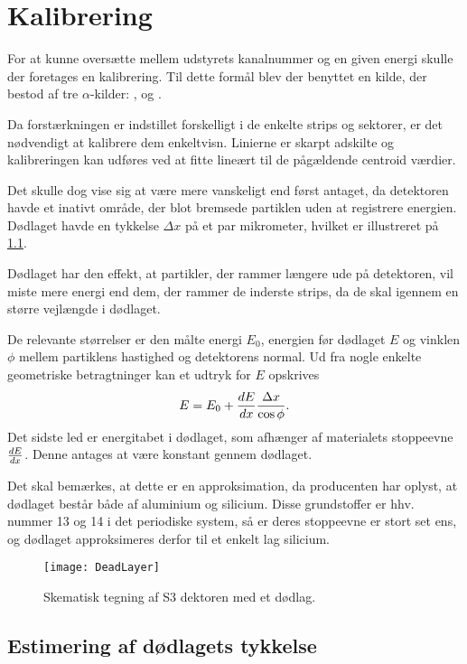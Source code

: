 \chapter{Kalibrering}
\label{cha:kalibrering}

For at kunne oversætte mellem udstyrets kanalnummer og en given energi skulle der foretages en
kalibrering. Til dette formål blev der benyttet en kilde, der bestod af tre $\alpha$-kilder:
,  og .

Da forstærkningen er indstillet forskelligt i de enkelte strips og sektorer, er det nødvendigt at
kalibrere dem enkeltvisn. Linierne er skarpt adskilte og kalibreringen kan udføres ved at fitte
lineært til de pågældende centroid værdier.

Det skulle dog vise sig at være mere vanskeligt end først antaget, da detektoren havde et inativt
område, der blot bremsede partiklen uden at registrere energien. Dødlaget havde en tykkelse
$\Delta x$ på et par mikrometer, hvilket er illustreret på \cref{fig:deadLayer}.

Dødlaget har den effekt, at partikler, der rammer længere ude på detektoren, vil miste mere energi
end dem, der rammer de inderste strips, da de skal igennem en større vejlængde i dødlaget.

De relevante størrelser er den målte energi $E_{0}$, energien før dødlaget $E$ og vinklen $\phi$ mellem
partiklens hastighed og detektorens normal. Ud fra nogle enkelte geometriske betragtninger kan et
udtryk for $E$ opskrives
\begin{equation}
  \label{eq:deadE}
  E = E_{0} + \frac{d E}{d x} \frac{\Delta x}{\cos \phi}  .
\end{equation}
Det sidste led er energitabet i dødlaget, som afhænger af materialets stoppeevne $\frac{d E}{d x}$. Denne
antages at være konstant gennem dødlaget.

Det skal bemærkes, at dette er en approksimation, da producenten har oplyst, at dødlaget består både
af aluminium og silicium. Disse grundstoffer er hhv. nummer 13 og 14 i det periodiske system, så er
deres stoppeevne er stort set ens, og dødlaget approksimeres derfor til et enkelt lag silicium.
\begin{figure}[h]
  \centering
  \texttt{[image: DeadLayer]}
  \caption{Skematisk tegning af S3 dektoren med et dødlag.}
  \label{fig:deadLayer}
\end{figure}

\section{Estimering af dødlagets tykkelse}
\label{sec:dodlag}

